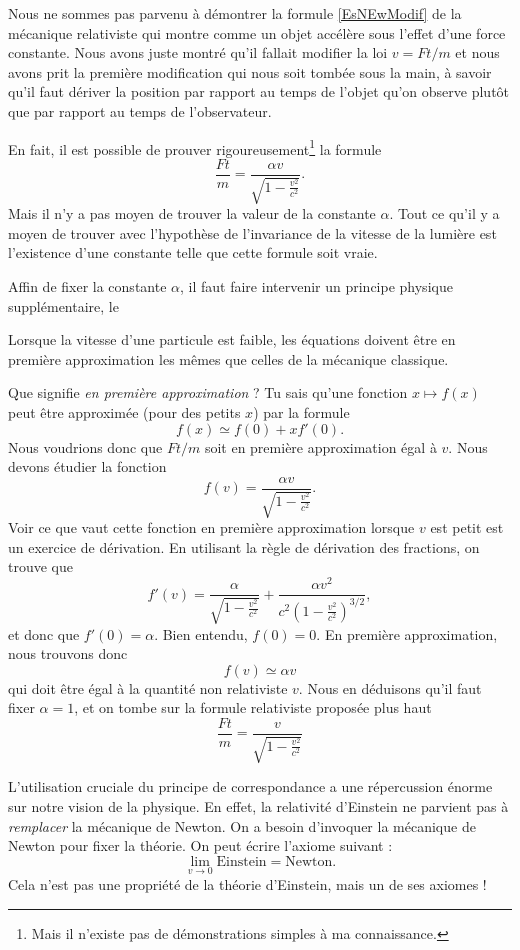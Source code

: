 Nous ne sommes pas parvenu à démontrer la formule \eqref{EsNEwModif} de la mécanique relativiste qui montre comme un objet accélère sous l'effet d'une force constante. Nous avons juste montré qu'il fallait modifier la loi $v=Ft/m$ et nous avons prit la première modification qui nous soit tombée sous la main, à savoir qu'il faut dériver la position par rapport au temps de l'objet qu'on observe plutôt que par rapport au temps de l'observateur.

En fait, il est possible de prouver rigoureusement\footnote{Mais il n'existe pas de démonstrations simples à ma connaissance.} la formule
\[ 
  \frac{ Ft }{ m }=\frac{ \alpha v }{ \sqrt{1-\frac{ v^2 }{ c^2 }} }.
\]
Mais il n'y a pas moyen de trouver la valeur de la constante $\alpha$. Tout ce qu'il y a moyen de trouver avec l'hypothèse de l'invariance de la vitesse de la lumière est l'existence d'une constante telle que cette formule soit vraie.

Affin de fixer la constante $\alpha$, il faut faire intervenir un principe physique supplémentaire, le 
\begin{loiphyz}
Lorsque la vitesse d'une particule est faible, les équations doivent être en première approximation les mêmes que celles de la mécanique classique.
\end{loiphyz}
Que signifie \emph{en première approximation} ? Tu sais qu'une fonction $x\mapsto f(x)$ peut être approximée (pour des petits $x$) par la formule
\[ 
  f(x)\simeq f(0)+xf'(0).
\]
Nous voudrions donc que $Ft/m$ soit en première approximation égal à $v$. Nous devons étudier la fonction
\[ 
  f(v)=\frac{ \alpha v }{ \sqrt{1-\frac{ v^2 }{ c^2 }} }.
\]
Voir ce que vaut cette fonction en première approximation lorsque $v$ est petit est un exercice de dérivation. En utilisant la règle de dérivation des fractions, on trouve que
\[ 
  f'(v)=\frac{ \alpha }{ \sqrt{1-\frac{ v^2 }{ c^2 }} }+\frac{ \alpha v^2 }{ c^2\left( 1-\frac{ v^2 }{ c^2 } \right)^{3/2} },
\]
et donc que $f'(0)=\alpha$. Bien entendu, $f(0)=0$. En première approximation, nous trouvons donc
\begin{equation}
f(v)\simeq \alpha v
\end{equation}
qui doit être égal à la quantité non relativiste $v$. Nous en déduisons qu'il faut fixer $\alpha=1$, et on tombe sur la formule relativiste proposée plus haut
\[ 
  \frac{ Ft }{ m }=\frac{ v }{ \sqrt{1-\frac{ v^2 }{ c^2 }} }
\]

L'utilisation cruciale du principe de correspondance a une répercussion énorme sur notre vision de la physique. En effet, la relativité d'Einstein ne parvient pas à \emph{remplacer} la mécanique de Newton. On a besoin d'invoquer la mécanique de Newton pour fixer la théorie. On peut écrire l'axiome suivant :
\begin{equation}
 \lim_{v\to 0}\text{Einstein}=\text{Newton}.
\end{equation}
Cela n'est pas une propriété de la théorie d'Einstein, mais un de ses axiomes !

